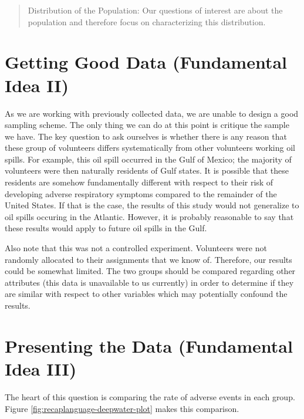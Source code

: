 \documentclass[]{book}
\theoremstyle{definition}
\theoremstyle{definition}
\theoremstyle{remark}
\begin{document}
\begin{quote}
Distribution of the Population: Our questions of interest are about the
population and therefore focus on characterizing this distribution.
\end{quote}

\section{Getting Good Data (Fundamental Idea
II)}\label{getting-good-data-fundamental-idea-ii}

As we are working with previously collected data, we are unable to
design a good sampling scheme. The only thing we can do at this point is
critique the sample we have. The key question to ask ourselves is
whether there is any reason that these group of volunteers differs
systematically from other volunteers working oil spills. For example,
this oil spill occurred in the Gulf of Mexico; the majority of
volunteers were then naturally residents of Gulf states. It is possible
that these residents are somehow fundamentally different with respect to
their risk of developing adverse respiratory symptoms compared to the
remainder of the United States. If that is the case, the results of this
study would not generalize to oil spills occuring in the Atlantic.
However, it is probably reasonable to say that these results would apply
to future oil spills in the Gulf.

Also note that this was not a controlled experiment. Volunteers were not
randomly allocated to their assignments that we know of. Therefore, our
results could be somewhat limited. The two groups should be compared
regarding other attributes (this data is unavailable to us currently) in
order to determine if they are similar with respect to other variables
which may potentially confound the results.

\section{Presenting the Data (Fundamental Idea
III)}\label{presenting-the-data-fundamental-idea-iii}

The heart of this question is comparing the rate of adverse events in
each group. Figure \ref{fig:recaplanguage-deepwater-plot} makes this
comparison.
\end{document}
